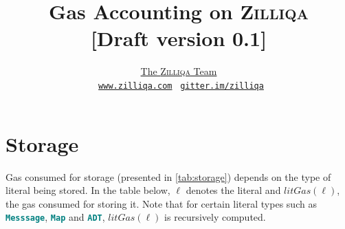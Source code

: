 \documentclass[9pt]{article}
\begin{document}
\title{\Huge{\textbf{Gas Accounting on \textsc{Zilliqa}}} \\ \small{[Draft version
0.1]}}

\author{
 	\href{https://www.zilliqa.com/team.html}{The \textsc{Zilliqa} Team} \\
    \Mundus~\href{https://www.zilliqa.com}{\texttt{www.zilliqa.com}}
    \phantom{xx}\faQuestionCircle~\href{https://gitter.im/Zilliqa/SmartContract}{\texttt{gitter.im/zilliqa}}
}


\maketitle

\section{Storage}

Gas consumed for storage (presented in \autoref{tab:storage}) depends on the
type of literal being stored. In the table below, $\ell$ denotes the literal
and $litGas(\ell)$, the gas consumed for storing it. Note that for certain
literal types such as \textbf{\texttt{\textcolor{teal}{Messsage}}},
\textbf{\texttt{\textcolor{teal}{Map}}} and
\textbf{\texttt{\textcolor{teal}{ADT}}}, $litGas(\ell)$ is recursively
computed. 
\end{document}

